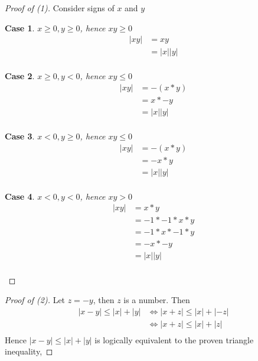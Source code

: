 \documentclass{article} %
\theoremstyle{plain}
\newtheorem{case}{Case}
\begin{document}
\begin{proof}[Proof of (1)] 
    \setcounter{case}{0}

    Consider signs of $x$ and $y$

    \begin{case} $x \geq 0, y \geq 0$, hence $xy \geq 0$
        \begin{align*}
            |xy| & = xy \\
            & = |x| |y| \\
        \end{align*}
    \end{case} 

    \begin{case} $x \geq 0, y < 0$, hence $xy \leq 0$
        \begin{align*}
            |xy| & = -(x * y) \\
            & = x * -y \\
            & = |x| |y| \\
        \end{align*}
    \end{case} 

    \begin{case} $x < 0, y \geq 0$, hence $xy \leq 0$
        \begin{align*}
            |xy| & = -(x * y) \\
            & = -x * y \\
            & = |x| |y| \\
        \end{align*}
    \end{case} 

    \begin{case} $x < 0, y < 0$, hence $xy > 0$
        \begin{align*}
            |xy| & = x * y \\
            & = -1 * -1 * x * y \\
            & = -1 * x * -1 * y \\
            & = -x * -y \\
            & = |x| |y| \\
        \end{align*}
    \end{case} 
\end{proof}

\begin{proof}[Proof of (2)]
    Let $z = -y$, then $z$ is a number.  Then
    \begin{align*}
        |x - y| \leq |x| + |y| & \iff |x + z| \leq |x| + |-z| \\
        & \iff |x + z| \leq |x| + |z| \\
    \end{align*}
    Hence $|x - y| \leq |x| + |y|$ is logically equivalent to the proven triangle inequality,
\end{proof}
\end{document}
